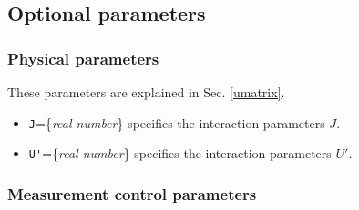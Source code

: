 \documentclass[aps,prb,floatfix,superscriptaddress,twocolumn,notitlepage]{revtex4-1}
\begin{document}
\subsection{Optional parameters}

\subsubsection{Physical parameters}

These parameters are explained in Sec. \ref{umatrix}.
\begin{itemize}
\item \verb#J#=\{\emph{real number}\} specifies the interaction parameters $J$.
\item \verb#U'#=\{\emph{real number}\} specifies the interaction parameters $U'$.
\end{itemize}

\subsubsection{Measurement control parameters}
\end{document}
